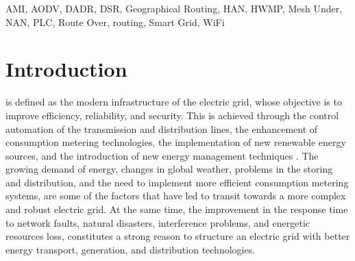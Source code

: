 \documentclass[11pt,draftclsnofoot,onecolumn]{IEEEtran}
\begin{document}
\begin{IEEEkeywords}
AMI, AODV, DADR, DSR, Geographical Routing, HAN, HWMP, Mesh Under, NAN, PLC, Route Over, routing, Smart Grid, WiFi
\end{IEEEkeywords}






%
\IEEEpeerreviewmaketitle


\section{Introduction}
 is defined as the modern infrastructure of the electric grid, whose objective is to improve efficiency, reliability, and security. This is achieved through the control automation of the transmission and distribution lines, the enhancement of consumption metering technologies, the implementation of new renewable energy sources, and the introduction of new energy management techniques \cite{Gungor2011}. The growing demand of energy, changes in global weather, problems in the storing and distribution, and the need to implement more efficient consumption metering systems, are some of the factors that have led to transit towards a more complex and robust electric grid. At the same time, the improvement in the response time to network faults, natural disasters, interference problems, and energetic resources loss, constitutes a strong reason to structure an electric grid with better energy transport, generation, and distribution technologies.

\end{document}
